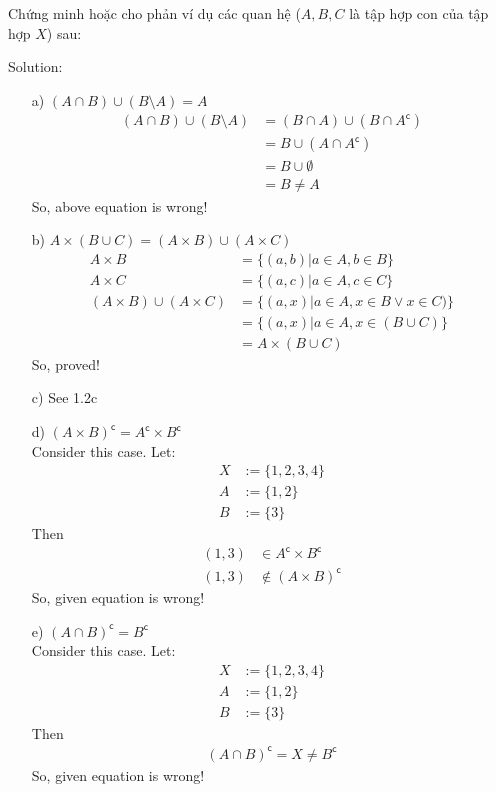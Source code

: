 
\begin{longfbox}
      \begin{bt} \label{pro:practice1.3}
            Chứng minh hoặc cho phản ví dụ các quan hệ ($A,B,C$ là tập hợp con của tập hợp $X$) sau:
      \end{bt}
\end{longfbox}
  
Solution:
\begin{enumerate}
\item[a)] $(A\cap B)\cup(B\setminus A) = A$ \\
      \begin{align}
            (A\cap B)\cup(B\setminus A) &= (B\cap A)\cup(B\cap A^\mathsf{c}) \\
            &= B\cup(A\cap A^\mathsf{c}) \\
            &= B\cup\emptyset \\
            &= B \neq A
      \end{align} 
      So, above equation is wrong!
\item[b)] $A\times (B\cup C) = (A\times B)\cup(A\times C)$ \\
      \begin{align}
            A\times B &= \{(a, b)| a\in A, b\in B\} \\
            A\times C &= \{(a, c)| a\in A, c\in C\} \\
            (A\times B)\cup(A\times C) &= \{(a, x)| a\in A, x\in B \lor x \in C)\} \\
            &= \{(a, x)| a\in A, x\in (B\cup C)\} \\
            &= A\times (B\cup C)
      \end{align} 
      So, proved!
\item[c)] See 1.2c
\item[d)] $(A\times B)^\mathsf{c} = A^\mathsf{c}\times B^\mathsf{c}$ \\
      Consider this case. Let:
      \begin{align}
            X &:=\{1,2,3,4\} \\
            A &:=\{1,2\} \\
            B &:=\{3\}
      \end{align}
      Then 
      \begin{align}
            (1,3) &\in A^\mathsf{c}\times B^\mathsf{c} \\
            (1,3) &\notin (A\times B)^\mathsf{c}
      \end{align}
      So, given equation is wrong!
\item[e)] $(A\cap B)^\mathsf{c} = B^\mathsf{c}$ \\
      Consider this case. Let:
      \begin{align}
            X &:=\{1,2,3,4\} \\
            A &:=\{1,2\} \\
            B &:=\{3\}
      \end{align}
      Then 
      \begin{align}
            (A\cap B)^\mathsf{c} = X \neq B^\mathsf{c}
      \end{align}
      So, given equation is wrong!
\end{enumerate}